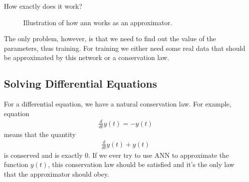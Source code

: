 \documentclass[letterpaper,10pt,english]{sphinxmanual}
\begin{document}
How exactly does it work?

\begin{figure}[htbp]
\centering
\capstart

\noindent{}
\caption{Illustration of how ann works as an approximator.}\label{\detokenize{machine-intelligence/ann:id2}}\end{figure}

The only problem, however, is that we need to find out the value of the parameters, thus training. For training we either need some real data that should be approximated by this network or a conservation law.


\subsection{Solving Differential Equations}
\label{\detokenize{machine-intelligence/ann:solving-differential-equations}}
For a differential equation, we have a natural conservation law. For example, equation
\begin{equation*}
\begin{split}\frac{d}{dt}y(t)= - y(t)\end{split}
\end{equation*}
means that the quantity
\begin{equation*}
\begin{split}\frac{d}{dt}y(t) + y(t)\end{split}
\end{equation*}
is conserved and is exactly 0. If we ever try to use ANN to approximate the function \(y(t)\), this conservation law should be satisfied and it’s the only law that the approximator should obey.
\end{document}
